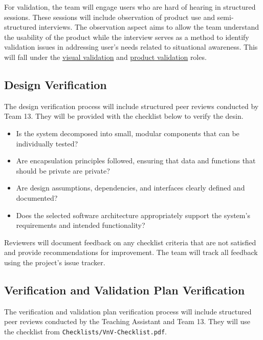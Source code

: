 \documentclass[12pt, titlepage]{article}
\begin{document}
For validation, the team will engage users who are hard of hearing in structured
sessions. These sessions will include observation of product use and
semi-structured interviews. The observation aspect aims to allow the team
understand the usability of the product while the interview serves as a method 
to identify validation issues in addressing user's needs related to situational
awareness. This will fall under the 
\hyperref[role:visual_vnv]{visual validation} and
\hyperref[role:product_validation]{product validation} roles.

\subsection{Design Verification}\label{sec:design_verification}

The design verification process will include structured peer reviews conducted
by Team 13. They will be provided with the checklist below to verify the desin.

\begin{itemize}
  \item Is the system decomposed into small, modular components that can be
  individually tested?

  \item Are encapsulation principles followed, ensuring that data and functions
  that should be private are private?

  \item Are design assumptions, dependencies, and interfaces clearly defined
  and documented?

  \item Does the selected software architecture appropriately support the
  system's requirements and intended functionality?
\end{itemize}

Reviewers will document feedback on any checklist criteria that are not
satisfied and provide recommendations for improvement. The team will track all 
feedback using the project's issue tracker.

\subsection{Verification and Validation Plan Verification}
\label{sec:vnv_plan_verification}

The verification and validation plan verification process will include
structured peer reviews conducted by the Teaching Assistant and Team 13.
They will use the checklist from \texttt{Checklists/VnV-Checklist.pdf}.
\end{document}
